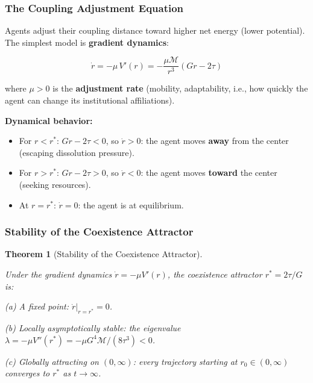 \documentclass[11pt]{article}
\theoremstyle{plain}
\newtheorem{theorem}{Theorem}
\theoremstyle{definition}
\theoremstyle{remark}
\let\origsubsubsection\subsubsection
\renewcommand{\subsubsection}{\needspace{4\baselineskip}\origsubsubsection}
\providecommand{\tightlist}{%
  \setlength{\itemsep}{0pt}\setlength{\parskip}{0pt}}
\begin{document}
\subsubsection{The Coupling Adjustment
Equation}\label{the-coupling-adjustment-equation}

Agents adjust their coupling distance toward higher net energy (lower
potential). The simplest model is \textbf{gradient dynamics}:

\[\dot{r} = -\mu \, V'(r) = -\frac{\mu \mathcal{M}}{r^3}(Gr - 2\tau)\]

where \(\mu > 0\) is the \textbf{adjustment rate} (mobility,
adaptability, i.e., how quickly the agent can change its institutional
affiliations).

\textbf{Dynamical behavior:}

\begin{itemize}
\tightlist
\item
  For \(r < r^*\): \(Gr - 2\tau < 0\), so \(\dot{r} > 0\): the agent
  moves \textbf{away} from the center (escaping dissolution pressure).
\item
  For \(r > r^*\): \(Gr - 2\tau > 0\), so \(\dot{r} < 0\): the agent
  moves \textbf{toward} the center (seeking resources).
\item
  At \(r = r^*\): \(\dot{r} = 0\): the agent is at equilibrium.
\end{itemize}

\subsubsection{Stability of the Coexistence
Attractor}\label{stability-of-the-coexistence-attractor}

\begin{theorem}[Stability of the Coexistence Attractor]
\label{thm-stability-coexistence-attractor}

Under the gradient dynamics $\dot{r} = -\mu V'(r)$, the coexistence attractor $r^* = 2\tau/G$ is:

(a) A fixed point: $\dot{r}|_{r=r^*} = 0$.

(b) Locally asymptotically stable: the eigenvalue $\lambda = -\mu V''(r^*) = -\mu G^4 \mathcal{M} / (8\tau^3) < 0$.

(c) Globally attracting on $(0, \infty)$: every trajectory starting at $r_0 \in (0, \infty)$ converges to $r^*$ as $t \to \infty$.
\end{theorem}
\end{document}
